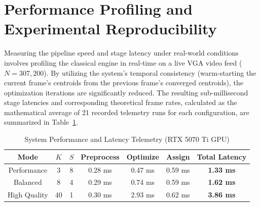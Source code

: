 \section{Performance Profiling and Experimental Reproducibility}
Measuring the pipeline speed and stage latency under real-world conditions involves profiling the classical engine in real-time on a live VGA video feed ($N = 307,200$). By utilizing the system's temporal consistency (warm-starting the current frame's centroids from the previous frame's converged centroids), the optimization iterations are significantly reduced. The resulting sub-millisecond stage latencies and corresponding theoretical frame rates, calculated as the mathematical average of 21 recorded telemetry runs for each configuration, are summarized in Table~\ref{tab:telemetry}.

\begin{table}[htbp]
\centering
\small
\caption[System Performance and Stage Latency Telemetry on RTX 5070 Ti]{System Performance and Latency Telemetry (RTX 5070 Ti GPU)}
\label{tab:telemetry}
\begin{tabular}{ccccccc}
\hline
\textbf{Mode} & \textbf{$K$} & \textbf{$S$} & \textbf{Preprocess} & \textbf{Optimize} & \textbf{Assign} & \textbf{Total Latency} \\ \hline
Performance  & 3  & 8 & 0.28 ms & 0.47 ms & 0.59 ms & \textbf{1.33 ms} \\
Balanced     & 8  & 4 & 0.29 ms & 0.74 ms & 0.59 ms & \textbf{1.62 ms} \\
High Quality & 40 & 1 & 0.30 ms & 2.93 ms & 0.62 ms & \textbf{3.86 ms} \\ \hline
\end{tabular}
\end{table}

